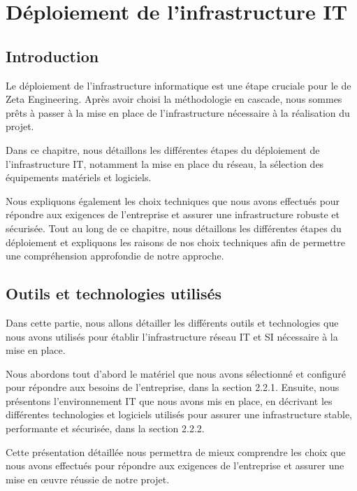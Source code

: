 \chapter{Déploiement de l'infrastructure IT}



\section{Introduction}

Le déploiement de l'infrastructure informatique est une étape cruciale pour le de Zeta Engineering. Après avoir choisi la méthodologie en cascade, nous sommes prêts à passer à la mise en place de l'infrastructure nécessaire à la réalisation du projet.

Dans ce chapitre, nous détaillons les différentes étapes du déploiement de l'infrastructure IT, notamment la mise en place du réseau, la sélection des équipements matériels et logiciels.

Nous expliquons également les choix techniques que nous avons effectués pour répondre aux exigences de l'entreprise et assurer une infrastructure robuste et sécurisée. Tout au long de ce chapitre, nous détaillons les différentes étapes du déploiement et expliquons les raisons de nos choix techniques afin de permettre une compréhension approfondie de notre approche.




\section{Outils et technologies utilisés}

Dans cette partie, nous allons détailler les différents outils et technologies que nous avons utilisés pour établir l'infrastructure réseau IT et SI nécessaire à la mise en place.

Nous abordons tout d'abord le matériel que nous avons sélectionné et configuré pour répondre aux besoins de l'entreprise, dans la section 2.2.1. Ensuite, nous présentons l'environnement IT que nous avons mis en place, en décrivant les différentes technologies et logiciels utilisés pour assurer une infrastructure stable, performante et sécurisée, dans la section 2.2.2.

Cette présentation détaillée nous permettra de mieux comprendre les choix que nous avons effectués pour répondre aux exigences de l'entreprise et assurer une mise en œuvre réussie de notre projet.

